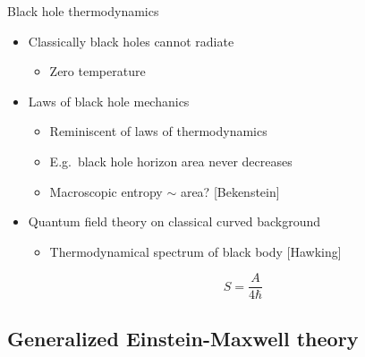 \documentclass{beamer}
\begin{document}
\begin{frame}{Black hole thermodynamics}

  \begin{itemize}
  \item Classically black holes cannot radiate
  \pause
    \begin{itemize}
    \item Zero temperature
    \end{itemize}
   
   \pause 
   \item Laws of black hole mechanics
     \begin{itemize}
     \item Reminiscent of laws of thermodynamics
     \item E.g.\ black hole horizon area never decreases
     \pause
     \item Macroscopic entropy $\sim$ area? [Bekenstein]
     \end{itemize}
  
  \pause  
  \item Quantum field theory on classical curved background
    \begin{itemize}
    \item Thermodynamical spectrum of black body [Hawking]
    \end{itemize}
    
    \begin{displaymath}
    S = \frac{A}{4\hbar}  
    \end{displaymath}
  \end{itemize}
  
\end{frame}

\subsection{Generalized Einstein-Maxwell theory}
\end{document}
